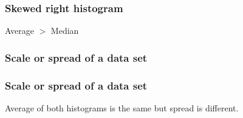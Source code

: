 \documentclass[handout]{beamer}
\begin{document}
   \begin{frame} \frametitle{Skewed right histogram}

   \begin{figure}
   \centering

   \end{figure}
   \begin{center}
   Average $>$ Median
   \end{center}
   \end{frame}



   \begin{frame}
   \frametitle{Scale or spread of a data set}
   \begin{center}
   \end{center}

   \end{frame}



   \begin{frame}
   \frametitle{Scale or spread of a data set}
   \begin{center}
   \end{center}
   Average of both histograms is the same but spread is different.
   \end{frame}

\end{document}
